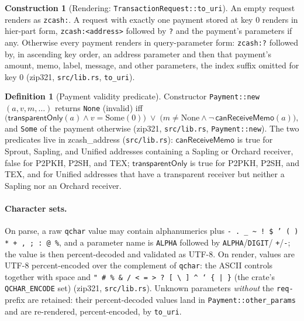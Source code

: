\documentclass[11pt,a4paper]{article}
\theoremstyle{definition}
\newtheorem{definition}[theorem]{Definition}
\newtheorem{construction}[theorem]{Construction}
\begin{document}
\begin{construction}[Rendering: \texttt{TransactionRequest::to\_uri}]
\label{def:zip321-render}
An empty request renders as \texttt{zcash:}. A request with exactly one
payment stored at key $0$ renders in hier-part form,
\texttt{zcash:<address>} followed by \texttt{?} and the payment's
parameters if any. Otherwise every payment renders in query-parameter form:
\texttt{zcash:?} followed by, in ascending key order, an address parameter
and then that payment's amount, memo, label, message, and other parameters,
the index suffix omitted for key $0$ (\textsf{zip321},
\texttt{src/lib.rs}, \texttt{to\_uri}).
\end{construction}

\begin{definition}[Payment validity predicate]\label{def:zip321-valid}
Constructor \texttt{Payment::new}$(a, v, m, \ldots)$ returns \texttt{None}
(invalid) iff
\[
\bigl(\mathsf{transparentOnly}(a) \wedge v = \mathrm{Some}(0)\bigr)
\;\vee\;
\bigl(m \neq \mathrm{None} \wedge \neg\,\mathsf{canReceiveMemo}(a)\bigr),
\]
and \texttt{Some} of the payment otherwise (\textsf{zip321},
\texttt{src/lib.rs}, \texttt{Payment::new}). The two predicates live in
\textsf{zcash\_address} (\texttt{src/lib.rs}):
$\mathsf{canReceiveMemo}$ is true for Sprout, Sapling, and Unified
addresses containing a Sapling or Orchard receiver, false for P2PKH, P2SH,
and TEX; $\mathsf{transparentOnly}$ is true for P2PKH, P2SH, and TEX, and
for Unified addresses that have a transparent receiver but neither a
Sapling nor an Orchard receiver.
\end{definition}

\paragraph{Character sets.} On parse, a raw \texttt{qchar} value may contain
alphanumerics plus
\texttt{- . \_ \textasciitilde\ ! \$ ' ( ) * + , ; : @ \%}, and a parameter
name is \texttt{ALPHA} followed by \texttt{ALPHA}/\texttt{DIGIT}/%
\texttt{+}/\texttt{-}; the value is then percent-decoded and validated as
UTF-8. On render, values are UTF-8 percent-encoded over the complement of
\texttt{qchar}: the ASCII controls together with space and
\texttt{" \# \% \& / < = > ? [ \textbackslash\ ] \textasciicircum\ ` \{ | \}}
(the crate's \texttt{QCHAR\_ENCODE} set) (\textsf{zip321},
\texttt{src/lib.rs}). Unknown parameters \emph{without} the \texttt{req-}
prefix are retained: their percent-decoded values land in
\texttt{Payment::other\_params} and are re-rendered, percent-encoded, by
\texttt{to\_uri}.
\end{document}

